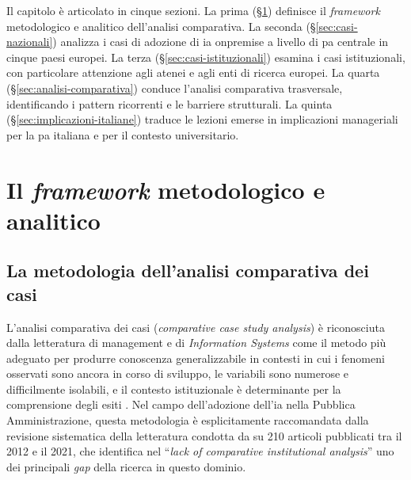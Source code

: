 Il capitolo è articolato in cinque sezioni. La prima (\S\ref{sec:framework-metodologico})
definisce il \textit{framework} metodologico e analitico dell'analisi comparativa.
La seconda (\S\ref{sec:casi-nazionali}) analizza i casi di adozione di \gls{ia}
\gls{onpremise} a livello di \gls{pa} centrale in cinque paesi europei. La terza
(\S\ref{sec:casi-istituzionali}) esamina i casi istituzionali, con particolare
attenzione agli atenei e agli enti di ricerca europei. La quarta
(\S\ref{sec:analisi-comparativa}) conduce l'analisi comparativa trasversale,
identificando i pattern ricorrenti e le barriere strutturali. La quinta
(\S\ref{sec:implicazioni-italiane}) traduce le lezioni emerse in implicazioni
manageriali per la \gls{pa} italiana e per il contesto universitario.

\section{Il \textit{framework} metodologico e analitico}
\label{sec:framework-metodologico}

\subsection{La metodologia dell'analisi comparativa dei casi}

L'analisi comparativa dei casi (\textit{comparative case study analysis}) è riconosciuta
dalla letteratura di management e di \textit{Information Systems} come il metodo
più adeguato per produrre conoscenza generalizzabile in contesti in cui i fenomeni
osservati sono ancora in corso di sviluppo, le variabili sono numerose e
difficilmente isolabili, e il contesto istituzionale è determinante per la
comprensione degli esiti \parencite{Mergel2019}. Nel campo dell'adozione dell'\gls{ia}
nella Pubblica Amministrazione, questa metodologia è esplicitamente raccomandata
dalla revisione sistematica della letteratura condotta da \textcite{Madan2023}
su 210 articoli pubblicati tra il 2012 e il 2021, che identifica nel
``\textit{lack of comparative institutional analysis}'' uno dei principali
\textit{gap} della ricerca in questo dominio.

